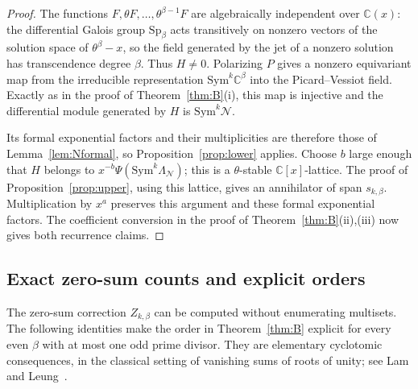 \documentclass[11pt]{amsart}
\theoremstyle{definition}
\newcommand{\C}{\mathbb C}
\newcommand{\Sp}{\mathrm{Sp}}
\newcommand{\Sym}{\mathrm{Sym}}
\begin{document}
\begin{proof}
The functions $F,\theta F,\ldots,\theta^{\beta-1}F$ are algebraically
independent over $\C(x)$: the differential Galois group $\Sp_\beta$
acts transitively on nonzero vectors of the solution space of
$\theta^\beta-x$, so the field generated by the jet of a nonzero solution
has transcendence degree $\beta$.  Thus $H\ne0$.
Polarizing $P$ gives a nonzero equivariant map from the irreducible
representation $\Sym^k\C^\beta$ into the Picard--Vessiot field.
Exactly as in the proof of Theorem~\ref{thm:B}\textup{(i)}, this map is
injective and the differential module generated by $H$ is
$\Sym^k\mathcal N$.

Its formal exponential factors and their multiplicities are therefore
those of Lemma~\ref{lem:Nformal}, so Proposition~\ref{prop:lower} applies.
Choose $b$ large enough that $H$ belongs to
$x^{-b}\Psi(\Sym^k\Lambda_{\mathcal N})$; this is a
$\theta$-stable $\C[x]$-lattice.  The proof of
Proposition~\ref{prop:upper}, using this lattice, gives an annihilator of
span $s_{k,\beta}$.  Multiplication by $x^a$ preserves this argument and
these formal exponential factors.  The coefficient conversion in the
proof of Theorem~\ref{thm:B}\textup{(ii),(iii)} now gives both recurrence
claims.
\end{proof}

\subsection{Exact zero-sum counts and explicit orders}

The zero-sum correction $Z_{k,\beta}$ can be computed without enumerating
multisets.  The following identities make the order in
Theorem~\ref{thm:B} explicit for every even $\beta$ with at most one odd
prime divisor.  They are elementary cyclotomic consequences, in the
classical setting of vanishing sums of roots of unity; see
Lam and Leung~\cite{LL00}.
\end{document}

